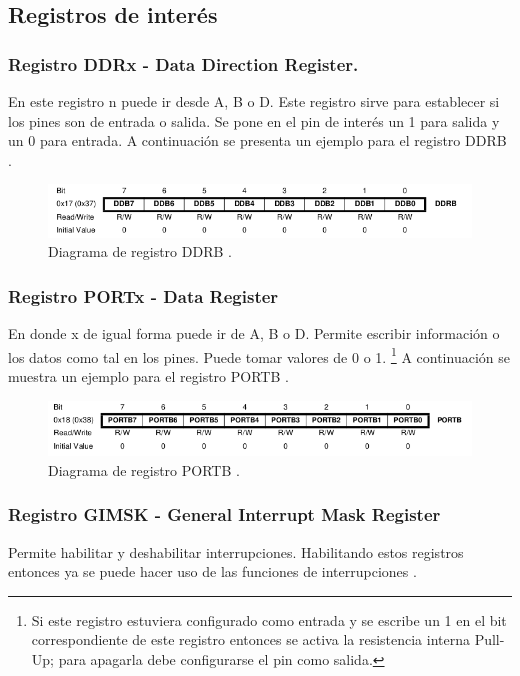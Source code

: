 \subsection{Registros de interés}
\subsubsection{Registro DDRx - Data Direction Register.}
En este registro n puede ir desde A, B o D. Este registro sirve para establecer si los pines son de entrada o salida. Se pone en el pin de interés un 1 para salida y un 0 para entrada. A continuación se presenta un ejemplo para el registro DDRB \cite{datasheet}.

\begin{figure}[H]
\centering
\includegraphics[scale=0.9]{./images/DDRB.png} 
\caption{Diagrama de registro DDRB \cite{datasheet}.}
\label{f1}
\end{figure}


\subsubsection{Registro PORTx - Data Register}
En donde x de igual forma puede ir de A, B o D. Permite escribir información o los datos como tal en los pines. Puede tomar valores de 0 o 1. \footnote{Si este registro estuviera configurado como entrada y se escribe un 1 en el bit correspondiente de este registro entonces se activa la resistencia interna Pull-Up; para apagarla debe configurarse el pin como salida.} A continuación se muestra un ejemplo para el registro PORTB \cite{datasheet}.
\begin{figure}[H]
\centering
\includegraphics[scale=0.9]{./images/PORTB.png} 
\caption{Diagrama de registro PORTB \cite{datasheet}.}
\label{f1}
\end{figure}

\subsubsection{Registro GIMSK - General Interrupt Mask Register}
Permite habilitar y deshabilitar interrupciones. Habilitando estos registros entonces ya se puede hacer uso de las funciones de interrupciones \cite{datasheet}.

